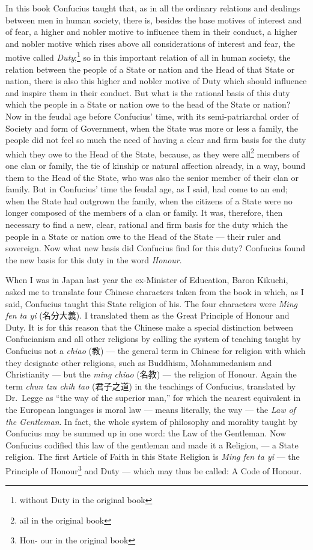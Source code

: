 In this book Confucius taught that, as in all the ordinary relations and dealings between men in human society, there is, besides the base motives of interest and of fear, a higher and nobler motive to influence them in their conduct, a higher and nobler motive which rises above all considerations of interest and fear, the motive called \emph{Duty};\footnote{without Duty in the original book} so in this important relation of all in human society, the relation between the people of a State or nation and the Head of that State or nation, there is also this higher and nobler motive of Duty which should influence and inspire them in their conduct.
But what is the rational basis of this duty which the people in a State or nation owe to the head of the State or nation?
Now in the feudal age before Confucius' time, with its semi-patriarchal order of Society and form of Government, when the State was more or less a family, the people did not feel so much the need of having a clear and firm basis for the duty which they owe to the Head of the State, because, as they were all\footnote{ail in the original book} members of one clan or family, the tie of kinship or natural affection already, in a way, bound them to the Head of the State, who was also the senior member of their clan or family.
But in Confucius' time the feudal age, as I said, had come to an end;
when the State had outgrown the family, when the citizens of a State were no longer composed of the members of a clan or family.
It was, therefore, then necessary to find a new, clear, rational and firm basis for the duty which the people in a State or nation owe to the Head of the State --- their ruler and sovereign.
Now what new basis did Confucius find for this duty?
Confucius found the new basis for this duty in the word \emph{Honour}.

When I was in Japan last year the ex-Minister of Education, Baron Kikuchi, asked me to translate four Chinese characters taken from the book in which, as I said, Confucius taught this State religion of his.
The four characters were \emph{Ming fen ta yi} (名分大義).
I translated them as the Great Principle of Honour and Duty.
It is for this reason that the Chinese make a special distinction between Confucianism and all other religions by calling the system of teaching taught by Confucius not a \emph{chiao} (教) --- the general term in Chinese for religion with which they designate other religions, such as Buddhism, Mohammedanism and Christianity --- but the \emph{ming chiao} (名教) --- the religion of Honour.
Again the term \emph{chun tzu chih tao} (君子之道) in the teachings of Confucius, translated by Dr.~Legge as ``the way of the superior man,'' for which the nearest equivalent in the European languages is moral law --- means literally, the way --- the {\em{Law of the Gentleman}}.
In fact, the whole system of philosophy and morality taught by Confucius may be summed up in one word: the Law of the Gentleman.
Now Confucius codified this law of the gentleman and made it a Religion, --- a State religion.
The first Article of Faith in this State Religion is \emph{Ming fen ta yi} --- the Principle of Honour\footnote{Hon- our in the original book} and Duty --- which may thus be called: A Code of Honour.

